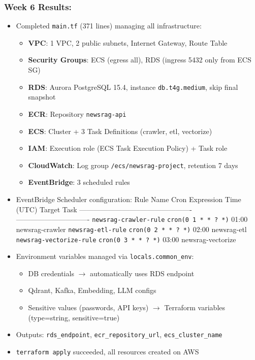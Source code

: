 \hypertarget{week-6-results}{%
\subsubsection{Week 6 Results:}}

\begin{itemize}
\item
  Completed \texttt{main.tf} (371 lines) managing all infrastructure:

  \begin{itemize}
  \tightlist
  \item
    \textbf{VPC}: 1 VPC, 2 public subnets, Internet Gateway, Route Table
  \item
    \textbf{Security Groups}: ECS (egress all), RDS (ingress 5432 only
    from ECS SG)
  \item
    \textbf{RDS}: Aurora PostgreSQL 15.4, instance
    \texttt{db.t4g.medium}, skip final snapshot
  \item
    \textbf{ECR}: Repository \texttt{newsrag-api}
  \item
    \textbf{ECS}: Cluster + 3 Task Definitions (crawler, etl, vectorize)
  \item
    \textbf{IAM}: Execution role (ECS Task Execution Policy) + Task role
  \item
    \textbf{CloudWatch}: Log group \texttt{/ecs/newsrag-project},
    retention 7 days
  \item
    \textbf{EventBridge}: 3 scheduled rules
  \end{itemize}
\item
  EventBridge Scheduler configuration: \textbar{} Rule Name \textbar{}
  Cron Expression \textbar{} Time (UTC) \textbar{} Target Task
  \textbar{}
  \textbar--------------------------\textbar----------------------\textbar------------\textbar-------------------\textbar{}
  \textbar{} \texttt{newsrag-crawler-rule} \textbar{}
  \texttt{cron(0\ 1\ *\ *\ ?\ *)} \textbar{} 01:00 \textbar{}
  newsrag-crawler \textbar{} \textbar{} \texttt{newsrag-etl-rule}
  \textbar{} \texttt{cron(0\ 2\ *\ *\ ?\ *)} \textbar{} 02:00 \textbar{}
  newsrag-etl \textbar{} \textbar{} \texttt{newsrag-vectorize-rule}
  \textbar{} \texttt{cron(0\ 3\ *\ *\ ?\ *)} \textbar{} 03:00 \textbar{}
  newsrag-vectorize \textbar{}
\item
  Environment variables managed via \texttt{locals.common\_env}:

  \begin{itemize}
  \tightlist
  \item
    DB credentials \(\rightarrow\) automatically uses RDS endpoint
  \item
    Qdrant, Kafka, Embedding, LLM configs
  \item
    Sensitive values (passwords, API keys) \(\rightarrow\) Terraform
    variables (type=string, sensitive=true)
  \end{itemize}
\item
  Outputs: \texttt{rds\_endpoint}, \texttt{ecr\_repository\_url},
  \texttt{ecs\_cluster\_name}
\item
  \texttt{terraform\ apply} succeeded, all resources created on AWS
\end{itemize}
